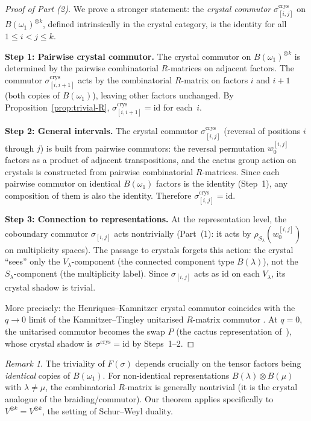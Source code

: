 \documentclass[11pt]{article}
\theoremstyle{remark}
\newtheorem{remark}[theorem]{Remark}
\newcommand{\id}{\mathrm{id}}
\begin{document}
\begin{proof}[Proof of Part (2)]
We prove a stronger statement: the \emph{crystal commutor}
$\sigma^{\mathrm{crys}}_{[i,j]}$ on $B(\omega_1)^{\otimes k}$,
defined intrinsically in the crystal category, is the identity for
all $1 \leq i < j \leq k$.

\medskip
\textbf{Step 1: Pairwise crystal commutor.}
The crystal commutor on $B(\omega_1)^{\otimes k}$ is determined by
the pairwise combinatorial $R$-matrices on adjacent factors.
The commutor $\sigma^{\mathrm{crys}}_{[i,i+1]}$ acts by the
combinatorial $R$-matrix on factors $i$ and $i+1$ (both copies of
$B(\omega_1)$), leaving other factors unchanged.
By Proposition~\ref{prop:trivial-R},
$\sigma^{\mathrm{crys}}_{[i,i+1]} = \id$ for each~$i$.

\medskip
\textbf{Step 2: General intervals.}
The crystal commutor $\sigma^{\mathrm{crys}}_{[i,j]}$ (reversal of
positions $i$ through $j$) is built from pairwise commutors: the
reversal permutation $w_0^{[i,j]}$ factors as a product of adjacent
transpositions, and the cactus group action on crystals is constructed
from pairwise combinatorial $R$-matrices. Since each pairwise
commutor on identical $B(\omega_1)$ factors is the identity
(Step~1), any composition of them is also the identity.
Therefore $\sigma^{\mathrm{crys}}_{[i,j]} = \id$.

\medskip
\textbf{Step 3: Connection to representations.}
At the representation level, the coboundary commutor $\sigma_{[i,j]}$
acts nontrivially (Part~(1): it acts by $\rho_{S_\lambda}(w_0^{[i,j]})$
on multiplicity spaces). The passage to crystals forgets this action:
the crystal ``sees'' only the $V_\lambda$-component (the connected
component type $B(\lambda)$), not the $S_\lambda$-component
(the multiplicity label). Since $\sigma_{[i,j]}$ acts as $\id$ on each
$V_\lambda$, its crystal shadow is trivial.

More precisely: the Henriques--Kamnitzer crystal commutor
\cite{henriques-kamnitzer} coincides with the $q \to 0$ limit of the
Kamnitzer--Tingley unitarised $R$-matrix commutor
\cite{kamnitzer-tingley}. At $q = 0$, the unitarised commutor becomes
the swap $P$ (the cactus representation of~\cite{clio-cactus}), whose
crystal shadow is $\sigma^{\mathrm{crys}} = \id$ by Steps~1--2. \qedhere
\end{proof}

\begin{remark}\label{rmk:non-identical}
The triviality of $F(\sigma)$ depends crucially on the tensor factors
being \emph{identical} copies of $B(\omega_1)$. For non-identical
representations $B(\lambda) \otimes B(\mu)$ with $\lambda \neq \mu$,
the combinatorial $R$-matrix is generally nontrivial (it is the crystal
analogue of the braiding/commutor). Our theorem applies specifically
to $V^{\otimes k} = V^{\otimes k}$, the setting of Schur--Weyl duality.
\end{remark}
\end{document}

